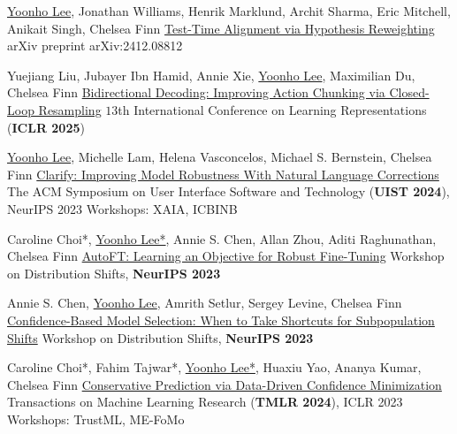
\newcommand{\me}{\underline{Yoonho Lee}}
\newcommand{\meeq}{\underline{Yoonho Lee*}}
\newcommand{\cf}{Chelsea Finn}
\newcommand{\ac}{Annie S. Chen}

\newcommand{\ljh}{Juho Lee}
\newcommand{\sjh}{Sung Ju Hwang}
\newcommand{\ehy}{Eunho Yang}
\newcommand{\sjc}{Seungjin Choi}
\newcommand{\jtk}{Jungtaek Kim}
\newcommand{\ywt}{Yee Whye Teh}
\setcounter{pubCounter}{23} %

\vspace{0pt}
\cvpub
{\me, Jonathan Williams, Henrik Marklund, Archit Sharma, Eric Mitchell, Anikait Singh, \cf}
{\href{https://arxiv.org/abs/2412.08812}{Test-Time Alignment via Hypothesis Reweighting}}
{arXiv preprint arXiv:2412.08812}

\cvpub
{Yuejiang Liu, Jubayer Ibn Hamid, Annie Xie, \me, Maximilian Du, \cf}
{\href{https://arxiv.org/abs/2408.17355}{Bidirectional Decoding: Improving Action Chunking via Closed-Loop Resampling}}
{$13$th International Conference on Learning Representations (\textbf{ICLR 2025})}

\cvpub
{\me, Michelle Lam, Helena Vasconcelos, Michael S. Bernstein, Chelsea Finn}
{\href{https://arxiv.org/abs/2402.03715}{Clarify: Improving Model Robustness With Natural Language Corrections}}
{The ACM Symposium on User Interface Software and Technology (\textbf{UIST 2024}), NeurIPS 2023 Workshops: XAIA, ICBINB}

\cvpub
{Caroline Choi*, \meeq, Annie S. Chen, Allan Zhou, Aditi Raghunathan, Chelsea Finn}
{\href{https://arxiv.org/abs/2401.10220}{AutoFT: Learning an Objective for Robust Fine-Tuning}}
{Workshop on Distribution Shifts, \textbf{NeurIPS 2023}}

\cvpub
{Annie S. Chen, \me, Amrith Setlur, Sergey Levine, Chelsea Finn}
{\href{https://arxiv.org/abs/2306.11120}{Confidence-Based Model Selection: When to Take Shortcuts for Subpopulation Shifts}}
{Workshop on Distribution Shifts, \textbf{NeurIPS 2023}}

\cvpub
{Caroline Choi*, Fahim Tajwar*, \meeq, Huaxiu Yao, Ananya Kumar, Chelsea Finn}
{\href{https://arxiv.org/abs/2306.04974}{Conservative Prediction via Data-Driven Confidence Minimization}}
{Transactions on Machine Learning Research (\textbf{TMLR 2024}), ICLR 2023 Workshops: TrustML, ME-FoMo}

